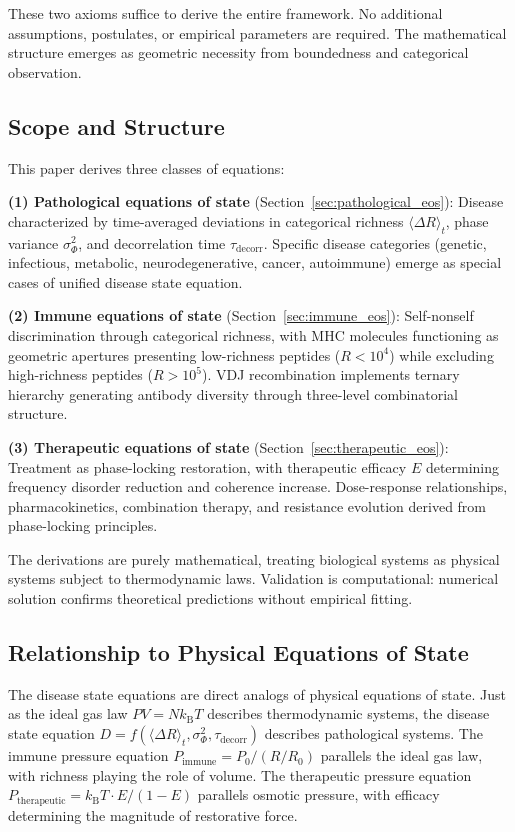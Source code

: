 \documentclass[12pt,a4paper]{article}
\theoremstyle{definition}
\theoremstyle{remark}
\newcommand{\kB}{k_{\mathrm{B}}}
\newcommand{\taudecorr}{\tau_{\mathrm{decorr}}}
\begin{document}
These two axioms suffice to derive the entire framework. No additional assumptions, postulates, or empirical parameters are required. The mathematical structure emerges as geometric necessity from boundedness and categorical observation.

\subsection{Scope and Structure}

This paper derives three classes of equations:

\textbf{(1) Pathological equations of state} (Section~\ref{sec:pathological_eos}): Disease characterized by time-averaged deviations in categorical richness $\langle\Delta R\rangle_t$, phase variance $\sigma_\Phi^2$, and decorrelation time $\taudecorr$. Specific disease categories (genetic, infectious, metabolic, neurodegenerative, cancer, autoimmune) emerge as special cases of unified disease state equation.

\textbf{(2) Immune equations of state} (Section~\ref{sec:immune_eos}): Self-nonself discrimination through categorical richness, with MHC molecules functioning as geometric apertures presenting low-richness peptides ($R < 10^4$) while excluding high-richness peptides ($R > 10^5$). VDJ recombination implements ternary hierarchy generating antibody diversity through three-level combinatorial structure.

\textbf{(3) Therapeutic equations of state} (Section~\ref{sec:therapeutic_eos}): Treatment as phase-locking restoration, with therapeutic efficacy $E$ determining frequency disorder reduction and coherence increase. Dose-response relationships, pharmacokinetics, combination therapy, and resistance evolution derived from phase-locking principles.

The derivations are purely mathematical, treating biological systems as physical systems subject to thermodynamic laws. Validation is computational: numerical solution confirms theoretical predictions without empirical fitting.

\subsection{Relationship to Physical Equations of State}

The disease state equations are direct analogs of physical equations of state. Just as the ideal gas law $PV = N\kB T$ describes thermodynamic systems, the disease state equation $D = f(\langle\Delta R\rangle_t, \sigma_\Phi^2, \taudecorr)$ describes pathological systems. The immune pressure equation $P_{\mathrm{immune}} = P_0/(R/R_0)$ parallels the ideal gas law, with richness playing the role of volume. The therapeutic pressure equation $P_{\mathrm{therapeutic}} = \kB T \cdot E/(1-E)$ parallels osmotic pressure, with efficacy determining the magnitude of restorative force.
\end{document}
